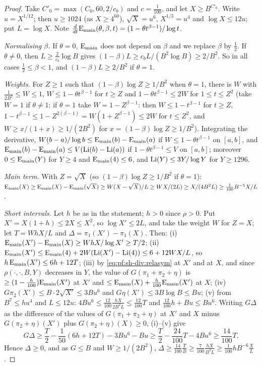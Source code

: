 \begin{proof}
Take $C'_0=\max(C_0,60,2/c_b)$ and $c=\frac1{100}$, and let $X\ge B^{C'_0}$. Write $u=X^{1/12}$; then $u\ge1024$ (as $X\ge4^{60}$),
$\sqrt X=u^6$, $X^{1/3}=u^4$ and $\log X\le12u$; put $L=\log X$. Note $\frac{d}{dt}\mathrm{E}_{\mathrm{main}}(\theta,\beta,t)=(1-\theta t^{\beta-1})/\log t$.

\emph{Normalising $\beta$.} If $\theta=0$, $\mathrm{E}_{\mathrm{main}}$ does not depend on $\beta$ and we replace $\beta$ by $\frac12$. If $\theta\ne0$, then
$L\ge\frac2{c_b}\log B$ gives $(1-\beta)L\ge c_bL/(B^2\log B)\ge2/B^2$. So in all cases
$\frac12\le\beta<1$, and $(1-\beta)L\ge2/B^2$ if $\theta=1$.

\emph{Weights.} For $Z\ge1$ such that $(1-\beta)\log Z\ge1/B^2$ when $\theta=1$, there is $W$ with $\frac1{2B^2}\le W\le1$,
$W\le1-\theta t^{\beta-1}$ for $t\ge Z$ and $1-\theta t^{\beta-1}\le2W$ for $1\le t\le Z^2$
(take $W=1$ if $\theta\ne1$; if $\theta=1$ take $W=1-Z^{\beta-1}$: then $W\le1-t^{\beta-1}$ for $t\ge Z$, $1-t^{\beta-1}\le1-Z^{2(\beta-1)}=W(1+Z^{\beta-1})\le2W$ for $t\le Z^2$, and $W\ge x/(1+x)\ge1/(2B^2)$ for $x=(1-\beta)\log Z\ge1/B^2$). Integrating
the derivative, $W(b-a)/\log b\le\mathrm{E}_{\mathrm{main}}(b)-\mathrm{E}_{\mathrm{main}}(a)$ if $W\le1-\theta t^{\beta-1}$ on $[a,b]$, and
$\mathrm{E}_{\mathrm{main}}(b)-\mathrm{E}_{\mathrm{main}}(a)\le V(\operatorname{Li}(b)-\operatorname{Li}(a))$ if $1-\theta t^{\beta-1}\le V$ on $[a,b]$; moreover $0\le\mathrm{E}_{\mathrm{main}}(Y)$ for $Y\ge4$ and
$\mathrm{E}_{\mathrm{main}}(4)\le6$, and $\operatorname{Li}(Y)\le3Y/\log Y$ for $Y\ge1296$.

\emph{Main term.} With $Z=\sqrt X$ (so $(1-\beta)\log Z\ge1/B^2$ if $\theta=1$): $\mathrm{E}_{\mathrm{main}}(X)\ge\mathrm{E}_{\mathrm{main}}(X)-\mathrm{E}_{\mathrm{main}}(\sqrt X)\ge W(X-\sqrt X)/L\ge
WX/(2L)\ge X/(4B^2L)\ge\frac1{100}B^{-5}X/L$.

\emph{Short intervals.} Let $h$ be as in the statement; $h>0$ since $\rho>0$. Put $X'=X(1+h)\le2X\le X^2$, so $\log X'\le2L$, and take
the weight $W$ for $Z=X$; let $T=WhX/L$ and $\Delta=\pi_1(X')-\pi_1(X)$. Then:
(i) $\mathrm{E}_{\mathrm{main}}(X')-\mathrm{E}_{\mathrm{main}}(X)\ge WhX/\log X'\ge T/2$;
(ii) $\mathrm{E}_{\mathrm{main}}(X')\le\mathrm{E}_{\mathrm{main}}(4)+2W(\operatorname{Li}(X')-\operatorname{Li}(4))\le6+12WX/L$, so $h\,\mathrm{E}_{\mathrm{main}}(X')\le6h+12T$;
(iii) by \eqref{eq:pf:sh-div:relasym} at $X'$ and at $X$, and since $\rho(\cdot,\cdot,B,Y)$ decreases in $Y$, the value of
$G(\pi_1+\pi_2+\eta)$ is $\ge(1-\frac h{100})\mathrm{E}_{\mathrm{main}}(X')$ at $X'$ and $\le\mathrm{E}_{\mathrm{main}}(X)+\frac h{100}\mathrm{E}_{\mathrm{main}}(X')$ at $X$;
(iv) $G\pi_2(X')\le B\cdot2\sqrt{X'}\le3Bu^6$ and $G\eta(X')\le3B\log B\le Bu$;
(v) from $B^7\le hu^4$ and $L\le12u$: $4Bu^6\le\frac{12}{100}\frac{hX}{2B^2L}\le\frac{12}{100}T$ and $\frac{12}{100}h+Bu\le Bu^6$.
Writing $G\Delta$ as the difference of the values of $G(\pi_1+\pi_2+\eta)$ at $X'$ and $X$ minus $G(\pi_2+\eta)(X')$ plus
$G(\pi_2+\eta)(X)\ge0$, (i)--(v) give
\[
G\Delta\ge\frac T2-\frac1{50}(6h+12T)-3Bu^6-Bu\ge\frac T2-\frac{24}{100}T-4Bu^6\ge\frac{14}{100}T .
\]
Hence $\Delta\ge0$, and as $G\le B$ and $W\ge1/(2B^2)$, $\Delta\ge\frac{14}{100}\frac T B\ge\frac7{100}\frac{hX}{B^3L}\ge\frac1{100}hB^{-6}\frac XL$.
\end{proof}

